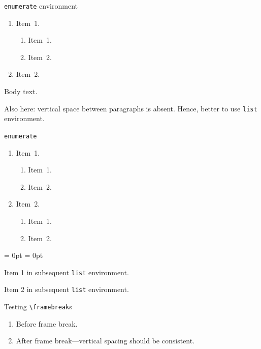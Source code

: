 \documentclass[aspectratio = 169, t, 10pt]{beamer}
\begin{document}
\begin{frame}{\texttt{enumerate} environment}

\begin{enumerate}
	\item Item~1. \par
	\begin{enumerate}
		\item Item~1.
		\item Item~2.
	\end{enumerate}
	\item Item~2.
\end{enumerate}

Body text.

Also here: vertical space between paragraphs is absent. Hence, better to use \texttt{list} environment.

\end{frame}


\begin{frame}[allowframebreaks]{\texttt{enumerate}}

\begin{enumerate}
	\item Item~1. \par
	\begin{enumerate}
		\item Item~1.
		\item Item~2.
	\end{enumerate}
	\framebreak
	\item Item~2. \par
	\begin{enumerate}
		\item Item~1.
		\item Item~2.
	\end{enumerate}
\end{enumerate}
\begin{list}{}{\leftmargin = 0pt \itemindent = 0pt}
	\item Item 1 in subsequent \texttt{list} environment.
	\item Item 2 in subsequent \texttt{list} environment.
\end{list}

\end{frame}


\begin{frame}[allowframebreaks]{Testing \texttt{\textbackslash framebreak}s}

\begin{enumerate}
	\item Before frame break.
	\framebreak
	\item After frame break---vertical spacing should be consistent.
\end{enumerate}

\end{frame}
\end{document}
